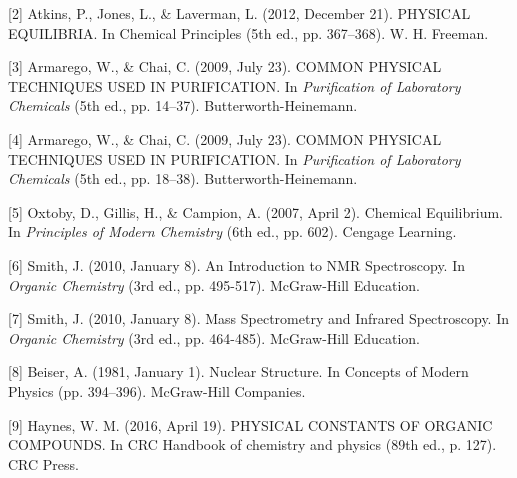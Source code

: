 \documentclass[%
 reprint,
 amsmath,amssymb,
 aps,
]{revtex4-2}
\begin{document}
[2] Atkins, P., Jones, L., \& Laverman, L. (2012, December 21). PHYSICAL EQUILIBRIA. In Chemical Principles (5th ed., pp. 367–368). W. H. Freeman.

[3] Armarego, W., \& Chai, C. (2009, July 23). COMMON PHYSICAL TECHNIQUES USED IN PURIFICATION. In \textit{Purification of Laboratory Chemicals} (5th ed., pp. 14–37). Butterworth-Heinemann.

[4] Armarego, W., \& Chai, C. (2009, July 23). COMMON PHYSICAL TECHNIQUES USED IN PURIFICATION. In \textit{Purification of Laboratory Chemicals} (5th ed., pp. 18–38). Butterworth-Heinemann.

[5] Oxtoby, D., Gillis, H., \& Campion, A. (2007, April 2). Chemical Equilibrium. In \textit{Principles of Modern Chemistry} (6th ed., pp. 602). Cengage Learning.

[6] Smith, J. (2010, January 8). An Introduction to NMR Spectroscopy. In \textit{Organic Chemistry} (3rd ed., pp. 495-517). McGraw-Hill Education.

[7] Smith, J. (2010, January 8). Mass Spectrometry and Infrared Spectroscopy. In \textit{Organic Chemistry} (3rd ed., pp. 464-485). McGraw-Hill Education.

[8] Beiser, A. (1981, January 1). Nuclear Structure. In Concepts of Modern Physics (pp. 394–396). McGraw-Hill Companies.

[9] Haynes, W. M. (2016, April 19). PHYSICAL CONSTANTS OF ORGANIC COMPOUNDS. In CRC Handbook of chemistry and physics (89th ed., p. 127). CRC Press.
\end{document}
